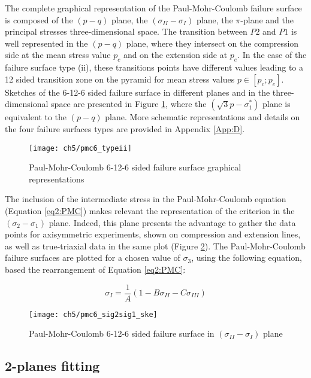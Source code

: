 The complete graphical representation of the Paul-Mohr-Coulomb failure surface is composed of the $(p-q)$ plane, the $(\sigma_{II}-\sigma_{I})$ plane, the $\pi$-plane and the principal stresses three-dimensional space. The transition between $P2$ and $P1$ is well represented in the $(p-q)$ plane, where they intersect on the compression side at the mean stress value $p_c$ and on the extension side at $p_e$. In the case of the failure surface type (ii), these transitions points have different values leading to a 12 sided transition zone on the pyramid for mean stress values $p \in \left[p_c;p_e\right]$. Sketches of the 6-12-6 sided failure surface in different planes and in the three-dimensional space are presented in Figure \ref{fig5:6pmc_typeii}, where the $(\sqrt{3}p-\sigma_{1}^*)$ plane is equivalent to the $(p-q)$ plane. More schematic representations and details on the four failure surfaces types are provided in Appendix \ref{App:D}.

\begin{figure}
    \centering
    \texttt{[image: ch5/pmc6\_typeii]}
    \caption{Paul-Mohr-Coulomb 6-12-6 sided failure surface graphical representations}
    \label{fig5:6pmc_typeii}
\end{figure}

The inclusion of the intermediate stress in the Paul-Mohr-Coulomb equation (Equation \ref{eq2:PMC}) makes relevant the representation of the criterion in the $(\sigma_2-\sigma_1)$ plane. Indeed, this plane presents the advantage to gather the data points for axisymmetric experiments, shown on compression and extension lines, as well as true-triaxial data in the same plot (Figure \ref{fig5:6pmc_sig2sig1}). The Paul-Mohr-Coulomb failure surfaces are plotted for a chosen value of $\sigma_3$, using the following equation, based the rearrangement of Equation \ref{eq2:PMC}:

\begin{equation}\label{eq5:pmc_sig2sig1}
    \sigma_I = \frac{1}{A}\left(1-B\sigma_{II}-C\sigma_{III}\right)
\end{equation}
\begin{figure}
    \centering
    \texttt{[image: ch5/pmc6\_sig2sig1\_ske]}
    \caption{Paul-Mohr-Coulomb 6-12-6 sided failure surface in $(\sigma_{II}-\sigma_{I})$ plane}
    \label{fig5:6pmc_sig2sig1}
\end{figure}

\subsection{2-planes fitting}\label{ch5:algo}

